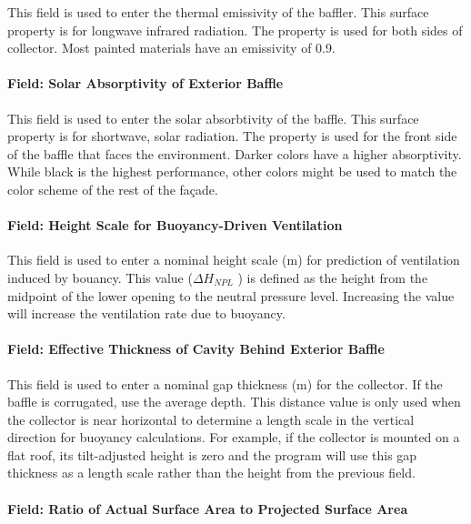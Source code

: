 This field is used to enter the thermal emissivity of the baffler. This surface property is for longwave infrared radiation. The property is used for both sides of collector. Most painted materials have an emissivity of 0.9.

\paragraph{Field: Solar Absorptivity of Exterior Baffle}\label{field-solar-absorptivity-of-exterior-baffle}

This field is used to enter the solar absorbtivity of the baffle. This surface property is for shortwave, solar radiation. The property is used for the front side of the baffle that faces the environment. Darker colors have a higher absorptivity. While black is the highest performance, other colors might be used to match the color scheme of the rest of the façade.

\paragraph{Field: Height Scale for Buoyancy-Driven Ventilation}\label{field-height-scale-for-buoyancy-driven-ventilation}

This field is used to enter a nominal height scale (m) for prediction of ventilation induced by bouancy. This value (\(\Delta {H_{NPL}}\) ) is defined as the height from the midpoint of the lower opening to the neutral pressure level. Increasing the value will increase the ventilation rate due to buoyancy.

\paragraph{Field: Effective Thickness of Cavity Behind Exterior Baffle}\label{field-effective-thickness-of-cavity-behind-exterior-baffle}

This field is used to enter a nominal gap thickness (m) for the collector. If the baffle is corrugated, use the average depth. This distance value is only used when the collector is near horizontal to determine a length scale in the vertical direction for buoyancy calculations. For example, if the collector is mounted on a flat roof, its tilt-adjusted height is zero and the program will use this gap thickness as a length scale rather than the height from the previous field.

\paragraph{Field: Ratio of Actual Surface Area to Projected Surface Area}\label{field-ratio-of-actual-surface-area-to-projected-surface-area}

